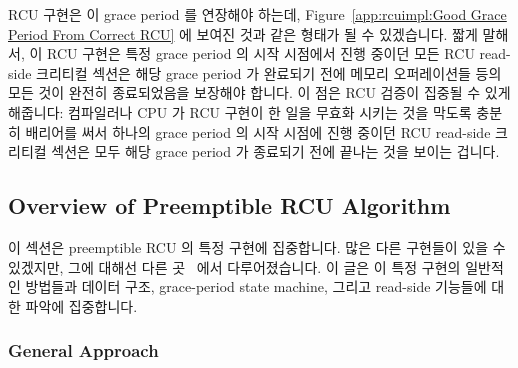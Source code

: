 RCU 구현은 이 grace period 를 연장해야 하는데,
Figure~\ref{app:rcuimpl:Good Grace Period From Correct RCU} 에 보여진 것과 같은
형태가 될 수 있겠습니다.
짧게 말해서, 이 RCU 구현은 특정 grace period 의 시작 시점에서 진행 중이던 모든
RCU read-side 크리티컬 섹션은 해당 grace period 가 완료되기 전에 메모리
오퍼레이션들 등의 모든 것이 완전히 종료되었음을 보장해야 합니다.
이 점은 RCU 검증이 집중될 수 있게 해줍니다: 컴파일러나 CPU 가 RCU 구현이 한
일을 무효화 시키는 것을 막도록 충분히 배리어를 써서 하나의 grace period 의 시작
시점에 진행 중이던 RCU read-side 크리티컬 섹션은 모두 해당 grace period 가
종료되기 전에 끝나는 것을  보이는 겁니다.

\subsection{Overview of Preemptible RCU Algorithm}
\label{app:rcuimpl:Overview of Preemptible RCU Algorithm}

이 섹션은 preemptible RCU 의 특정 구현에 집중합니다.
많은 다른 구현들이 있을 수 있겠지만, 그에 대해선 다른
곳~\cite{PaulEMcKenney2006b,PaulMcKenney05b} 에서 다루어졌습니다.
이 글은 이 특정 구현의 일반적인 방법들과 데이터 구조, grace-period state
machine, 그리고 read-side 기능들에 대한 파악에 집중합니다.

\subsubsection{General Approach}
\label{app:rcuimpl:General Approach}

